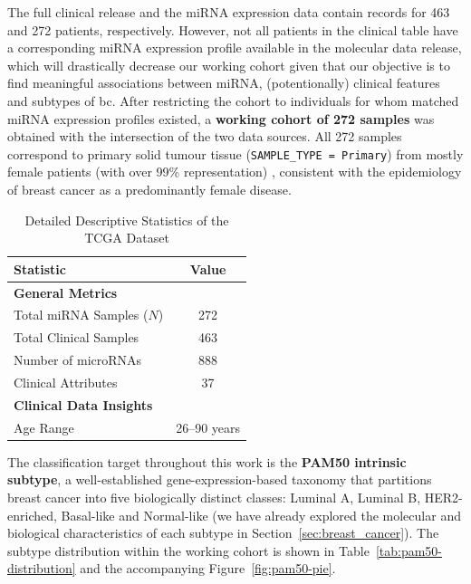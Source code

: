 The full clinical release and the miRNA expression data contain records for 463 and 272 patients, respectively. However, not all
patients in the clinical table have a corresponding miRNA expression profile
available in the molecular data release, which will drastically decrease our 
working cohort given that our objective is to find meaningful associations between 
miRNA, (potentionally) clinical features and subtypes of \gls{bc}. 
After restricting the cohort to
individuals for whom matched miRNA expression profiles existed, a \textbf{working
cohort of 272 samples} was obtained with the intersection of the two data sources.
All 272 samples correspond to primary solid tumour tissue
(\texttt{SAMPLE\_TYPE = Primary}) from mostly female patients (with over 99\% representation)
, consistent with the epidemiology of breast cancer as a predominantly female disease.

\begin{table}[!ht]
    \centering
    \caption{Detailed Descriptive Statistics of the TCGA Dataset}
    \label{tab:detailed_statistics}
    \small
    \begin{tabular}{lc}
        \toprule
        \textbf{Statistic} & \textbf{Value} \\
        \midrule
        \textbf{General Metrics} & \\
        Total miRNA Samples ($N$) & 272 \\
        Total Clinical Samples & 463 \\
        Number of microRNAs & 888 \\
        Clinical Attributes & 37 \\
        \midrule
        \textbf{Clinical Data Insights} & \\
        Age Range & 26--90 years \\
        \bottomrule
    \end{tabular}
\end{table}

The classification target throughout this work is the \textbf{PAM50 intrinsic
subtype}, a well-established gene-expression-based taxonomy that partitions
breast cancer into five biologically distinct classes: Luminal A, Luminal B,
HER2-enriched, Basal-like and Normal-like (we have already explored the molecular 
and biological characteristics of each subtype in Section~\ref{sec:breast_cancer}). 
The subtype distribution within the working cohort is shown in 
Table~\ref{tab:pam50-distribution} and the accompanying Figure~\ref{fig:pam50-pie}.


